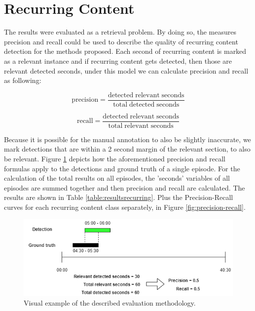 \documentclass{report}
\begin{document}
\section{Recurring Content}
The results were evaluated as a retrieval problem. By doing so, the measures precision and recall could be used to describe the quality of recurring content detection for the methods proposed. Each second of recurring content is marked as a relevant instance and if recurring content gets detected, then those are relevant detected seconds, under this model we can calculate precision and recall as following:

\[\mathrm{precision} = \frac{\mathrm{detected\;relevant\;seconds}}{\mathrm{total\;detected\;seconds}}\]

\[\mathrm{recall} = \frac{\mathrm{detected\;relevant\;seconds}}{\mathrm{total\;relevant\;seconds}}\]

Because it is possible for the manual annotation to also be slightly inaccurate, we mark detections that are within a 2 second margin of the relevant section, to also be relevant. Figure \ref{fig:evaluation-example} depicts how the aforementioned precision and recall formulas apply to the detections and ground truth of a single episode. For the calculation of the total results on all episodes, the 'seconds' variables of all episodes are summed together and then precision and recall are calculated. The results are shown in Table \ref{table:resultsrecurring}. Plus the Precision-Recall curves for each recurring content class separately, in Figure \ref{fig:precision-recall}.

\begin{figure}[H]
	\includegraphics[width=\textwidth]{images/evaluation.png}
	\centering
	\caption{Visual example of the described evaluation methodology.}
	\label{fig:evaluation-example}
\end{figure}
\end{document}

